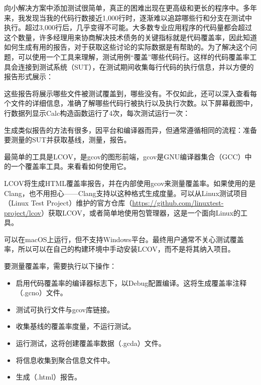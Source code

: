 
向小解决方案中添加测试很简单，真正的困难出现在更高级和更长的程序中。多年来，我发现当我的代码行数接近1,000行时，逐渐难以追踪哪些行和分支在测试中执行。超过3,000行后，几乎变得不可能。大多数专业应用程序的代码量都会超过这个数量，许多经理用来协商解决技术债务的关键指标就是代码覆盖率，因此知道如何生成有用的报告，对于获取这些讨论的实际数据是有帮助的。为了解决这个问题，可以使用一个工具来理解，测试用例“覆盖”哪些代码行。这样的代码覆盖率工具会连接到测试系统（SUT），在测试期间收集每行代码的执行信息，并以方便的报告形式展示：


这些报告将展示哪些文件被测试覆盖到，哪些没有。不仅如此，还可以深入查看每个文件的详细信息，准确了解哪些代码行被执行以及执行次数。以下屏幕截图中，行数据列显示Calc构造函数运行了4次，每次测试运行一次：


生成类似报告的方法有很多，因平台和编译器而异，但通常遵循相同的流程：准备要测量的SUT并获取基线，测量，报告。

最简单的工具是LCOV，是gcov的图形前端，gcov是GNU编译器集合（GCC）中的一个覆盖率工具。来看看如何使用它。


LCOV将生成HTML覆盖率报告，并在内部使用gcov来测量覆盖率。如果使用的是Clang，也不用担心——Clang支持以这种格式生成度量。可以从Linux测试项目（Linux Test Project）维护的官方仓库（\url{https://github.com/linuxtest-project/lcov}）获取LCOV，或者简单地使用包管理器，这是一个面向Linux的工具。

可以在macOS上运行，但不支持Windows平台。最终用户通常不关心测试覆盖率，所以可以在自己的构建环境中手动安装LCOV，而不是将其纳入项目。

要测量覆盖率，需要执行以下操作：

\begin{itemize}
\item
启用代码覆盖率的编译器标志下，以Debug配置编译。这将生成覆盖率注释（.gcno）文件。

\item
测试可执行文件与gcov库链接。

\item
收集基线的覆盖率度量，不运行测试。

\item
运行测试，这将创建覆盖率数据（.gcda）文件。

\item
将信息收集到聚合信息文件中。

\item
生成（.html）报告。
\end{itemize}

